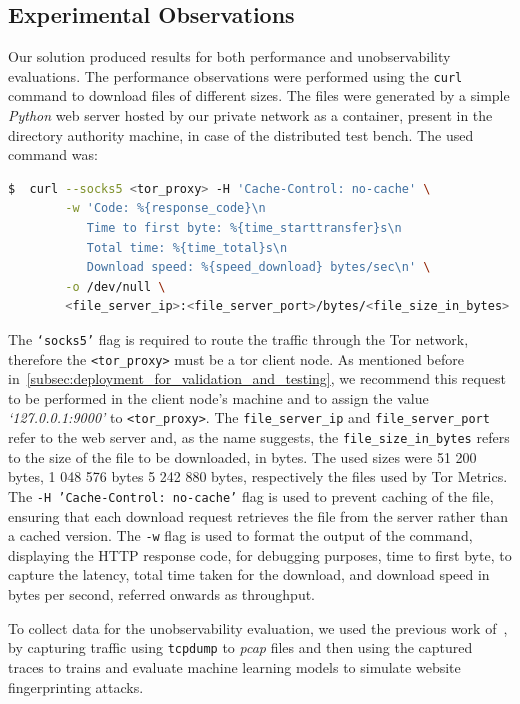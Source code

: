 \subsection{Experimental Observations}\label{sec:experimental_observations}

Our solution produced results for both performance and unobservability evaluations. The performance observations were performed using the \texttt{curl} command to download files of different sizes. The files were generated by a simple \textit{Python} web server hosted by our private network as a container, present in the directory authority machine, in case of the distributed test bench. The used command was:

\begin{lstlisting}[language=bash]
  $  curl --socks5 <tor_proxy> -H 'Cache-Control: no-cache' \
        -w 'Code: %{response_code}\n
           Time to first byte: %{time_starttransfer}s\n
           Total time: %{time_total}s\n
           Download speed: %{speed_download} bytes/sec\n' \
        -o /dev/null \
        <file_server_ip>:<file_server_port>/bytes/<file_size_in_bytes>
\end{lstlisting}

The \texttt{`socks5'} flag is required to route the traffic through the Tor network, therefore the \texttt{<tor\_proxy>} must be a tor client node. As mentioned before in~\autoref{subsec:deployment_for_validation_and_testing}, we recommend this request to be performed in the client node's machine and to assign the value \textit{`127.0.0.1:9000'} to \texttt{<tor\_proxy>}. The \texttt{file\_server\_ip} and \texttt{file\_server\_port} refer to the web server and, as the name suggests, the \texttt{file\_size\_in\_bytes} refers to the size of the file to be downloaded, in bytes. The used sizes were 51 200 bytes, 1 048 576 bytes 5 242 880 bytes, respectively the files used by Tor Metrics. The \texttt{-H 'Cache-Control: no-cache'} flag is used to prevent caching of the file, ensuring that each download request retrieves the file from the server rather than a cached version. The \texttt{-w} flag is used to format the output of the command, displaying the HTTP response code, for debugging purposes, time to first byte, to capture the latency, total time taken for the download, and download speed in bytes per second, referred onwards as throughput.

To collect data for the unobservability evaluation, we used the previous work of~\citeauthor{MIRACE}\cite{MIRACE}, by capturing traffic using \texttt{tcpdump} to \textit{pcap} files and then using the captured traces to trains and evaluate machine learning models to simulate website fingerprinting attacks. 

